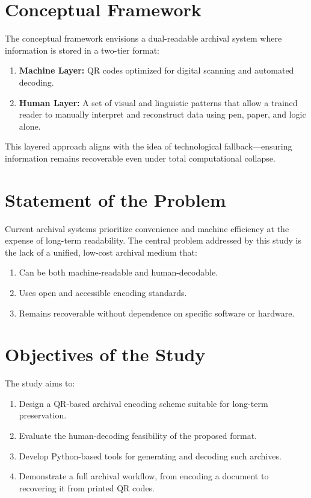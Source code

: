 \documentclass[../../1_thesis]{subfiles}
\begin{document}
\section{Conceptual Framework}

The conceptual framework envisions a dual-readable archival system where information is stored in a two-tier format:

\begin{enumerate}
\item \textbf{Machine Layer:} QR codes optimized for digital scanning and automated decoding.
\item \textbf{Human Layer:} A set of visual and linguistic patterns that allow a trained reader to manually interpret and reconstruct data using pen, paper, and logic alone.
\end{enumerate}

This layered approach aligns with the idea of technological fallback—ensuring information remains recoverable even under total computational collapse.

\section{Statement of the Problem}

Current archival systems prioritize convenience and machine efficiency at the expense of long-term readability. The central problem addressed by this study is the lack of a unified, low-cost archival medium that:
\begin{enumerate}
\item Can be both machine-readable and human-decodable.
\item Uses open and accessible encoding standards.
\item Remains recoverable without dependence on specific software or hardware.
\end{enumerate}

\section{Objectives of the Study}

The study aims to:
\begin{enumerate}
\item Design a QR-based archival encoding scheme suitable for long-term preservation.
\item Evaluate the human-decoding feasibility of the proposed format.
\item Develop Python-based tools for generating and decoding such archives.
\item Demonstrate a full archival workflow, from encoding a document to recovering it from printed QR codes.
\end{enumerate}
\end{document}
